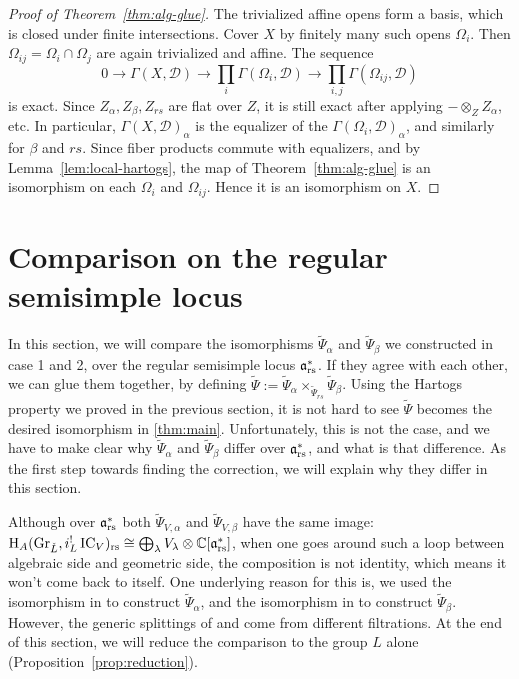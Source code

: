 \documentclass{article}
\theoremstyle{plain}
\theoremstyle{definition}
\theoremstyle{remark}
\numberwithin{equation}{section}
\begin{document}
\begin{proof}[Proof of Theorem~\ref{thm:alg-glue}]
The trivialized affine opens form a basis, which is closed under finite intersections. Cover $X$ by finitely many such opens $\Omega_i$. Then $\Omega_{ij}=\Omega_i\cap \Omega_j$ are again trivialized and
affine. The sequence
\[
0\to\Gamma(X,\mathcal D)\to\prod_i\Gamma(\Omega_i,\mathcal D)\to\prod_{i,j}\Gamma(\Omega_{ij},\mathcal D)
\]
is exact. Since $Z_\alpha,Z_\beta,Z_{rs}$ are flat over $Z$, it is still exact after applying $-\otimes_ZZ_\alpha$, etc.
In particular, $\Gamma(X,\mathcal D)_\alpha$ is the equalizer of the $\Gamma(\Omega_i,\mathcal D)_\alpha$, and similarly for
$\beta$ and $rs$. Since fiber products commute with equalizers, and by Lemma~\ref{lem:local-hartogs}, the map of
Theorem~\ref{thm:alg-glue} is an isomorphism on each $\Omega_i$ and $\Omega_{ij}$. Hence it is an isomorphism on $X$.
\end{proof}


\section{Comparison on the regular semisimple locus}\label{sec:rs-compat}
In this section, we will compare the isomorphisms $\widetilde \Psi_{\alpha}$ and $\widetilde \Psi_{\beta}$ we constructed in case 1 and 2, over the regular semisimple locus $\mathfrak{a}^*_{\mathrm{rs}}$. If they agree with each other, we can glue them together, by defining $\widetilde \Psi := \widetilde \Psi_{\alpha} \times_{\widetilde \Psi_{rs}} \widetilde \Psi_{\beta}$. Using the Hartogs property we proved in the previous section, it is not hard to see $\widetilde \Psi$ becomes the desired isomorphism in \ref{thm:main}. Unfortunately, this is not the case, and we have to make clear why $\widetilde \Psi_{\alpha}$ and $\widetilde \Psi_{\beta}$ differ over $\mathfrak{a}^*_{\mathrm{rs}}$, and what is that difference. As the first step towards finding the correction, we will explain why they differ in this section.

Although over $\mathfrak{a}^*_{\mathrm{rs}}$ both $\widetilde\Psi_{V,\alpha}$ and $\widetilde\Psi_{V,\beta}$ have the same image: $\mathrm{H}_A(\operatorname{Gr}_{\check{L}},i_L^!\operatorname{IC}_V)_{\mathrm{rs}}\cong\bigoplus_\lambda V_\lambda\otimes\mathbb{C}[\mathfrak{a}^*_{\mathrm{rs}}]$, when one goes around such a loop between algebraic side and geometric side, the composition is not identity, which means it won't come back to itself.
One underlying reason for this is, we used the isomorphism in \cite{bezrukavnikov2026equivariantsatakecategorykostantwhittaker} to construct $\widetilde \Psi_{\alpha}$, and the isomorphism in \cite{ginzburg2014differentialoperatorsguaffine} to construct $\widetilde \Psi_{\beta}$. However, the generic splittings of \cite{bezrukavnikov2026equivariantsatakecategorykostantwhittaker} and \cite{ginzburg2014differentialoperatorsguaffine} come from different filtrations. At the end of this section,  we will reduce the comparison to the group $L$ alone (Proposition~\ref{prop:reduction}).
\end{document}
